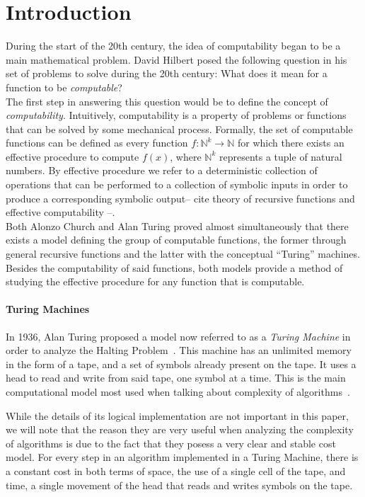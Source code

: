 \documentclass[11pt]{article}
\begin{document}
\section{Introduction}
During the start of the 20th century, the idea of computability began to be a main mathematical problem. David Hilbert posed the following question in his set of problems to solve during the 20th century: What does it mean for a function to be \textit{computable}? \\
The first step in answering this question would be to define the concept of \textit{computability}. Intuitively, computability is a property of problems or functions that can be solved by some mechanical process. Formally, the set of computable functions can be defined as every function $f : \mathbb{N}^k \rightarrow \mathbb{N}$ for which there exists an effective procedure to compute $f(x)$, where $\mathbb{N}^k$ represents a tuple of natural numbers. By effective procedure we refer to a deterministic collection of operations that can be performed to a collection of symbolic inputs in order to produce a corresponding symbolic output-- cite theory of recursive functions and effective computability --. \\
 Both Alonzo Church and Alan Turing proved almost simultaneously that there exists a model defining the group of computable functions, the former through general recursive functions and the latter with the conceptual \enquote{Turing} machines.
 Besides the computability of said functions, both models provide a method of studying the effective procedure for any function that is computable.

\paragraph{Turing Machines}
In 1936, Alan Turing proposed a model now referred to as a \textit{Turing Machine} in order to analyze the Halting Problem~\cite{on-computable-numbers}. This machine has an unlimited memory in the form of a tape, and a set of symbols already present on the tape. It uses a head to read and write from said tape, one symbol at a time. This is the main computational model most used when talking about complexity of algorithms~\cite{computation-theory}.

While the details of its logical implementation are not important in this paper, we will note that the reason they are very useful when analyzing the complexity of algorithms is due to the fact that they posess a very clear and stable cost model. For every step in an algorithm implemented in a Turing Machine, there is a constant cost in both terms of space, the use of a single cell of the tape, and time, a single movement of the head that reads and writes symbols on the tape.
\end{document}
